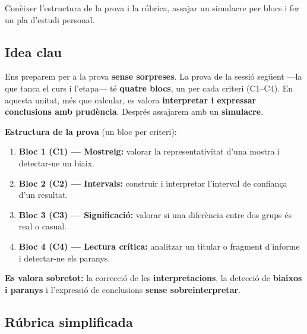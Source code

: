 %
{Conèixer l'estructura de la prova i la rúbrica, assajar un simulacre per blocs i fer un pla d'estudi personal.}

\subsection{Idea clau}

Ens preparem per a la prova \textbf{sense sorpreses}. La prova de la sessió següent —la que
tanca el curs i l'etapa— té \textbf{quatre blocs}, un per cada criteri (C1--C4). En aquesta
unitat, més que calcular, es valora \textbf{interpretar i expressar conclusions amb
prudència}. Després assajarem amb un \textbf{simulacre}.

\begin{idea}
\textbf{Estructura de la prova} (un bloc per criteri):
\begin{enumerate}[leftmargin=1.6em, itemsep=2pt]
  \item \textbf{Bloc 1 (C1) — Mostreig:} valorar la representativitat d'una mostra i
        detectar-ne un biaix.
  \item \textbf{Bloc 2 (C2) — Intervals:} construir i interpretar l'interval de confiança
        d'un resultat.
  \item \textbf{Bloc 3 (C3) — Significació:} valorar si una diferència entre dos grups és
        real o casual.
  \item \textbf{Bloc 4 (C4) — Lectura crítica:} analitzar un titular o fragment d'informe i
        detectar-ne els paranys.
\end{enumerate}
\textbf{Es valora sobretot:} la correcció de les \textbf{interpretacions}, la detecció de
\textbf{biaixos i paranys} i l'expressió de conclusions \textbf{sense sobreinterpretar}.
\end{idea}

\subsection{Rúbrica simplificada}

